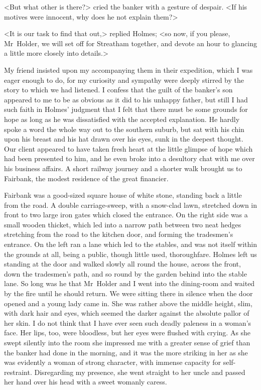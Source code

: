 <But what other is there?> cried the banker with a gesture of despair. <If his motives were innocent, why does he not explain them?>

<It is our task to find that out,> replied Holmes; <so now, if you please, Mr~Holder, we will set off for Streatham together, and devote an hour to glancing a little more closely into details.>

My friend insisted upon my accompanying them in their expedition, which I was eager enough to do, for my curiosity and sympathy were deeply stirred by the story to which we had listened. I confess that the guilt of the banker's son appeared to me to be as obvious as it did to his unhappy father, but still I had such faith in Holmes' judgment that I felt that there must be some grounds for hope as long as he was dissatisfied with the accepted explanation. He hardly spoke a word the whole way out to the southern suburb, but sat with his chin upon his breast and his hat drawn over his eyes, sunk in the deepest thought. Our client appeared to have taken fresh heart at the little glimpse of hope which had been presented to him, and he even broke into a desultory chat with me over his business affairs. A short railway journey and a shorter walk brought us to Fairbank, the modest residence of the great financier.

Fairbank was a good-sized square house of white stone, standing back a little from the road. A double carriage-sweep, with a snow-clad lawn, stretched down in front to two large iron gates which closed the entrance. On the right side was a small wooden thicket, which led into a narrow path between two neat hedges stretching from the road to the kitchen door, and forming the tradesmen's entrance. On the left ran a lane which led to the stables, and was not itself within the grounds at all, being a public, though little used, thoroughfare. Holmes left us standing at the door and walked slowly all round the house, across the front, down the tradesmen's path, and so round by the garden behind into the stable lane. So long was he that Mr~Holder and I went into the dining-room and waited by the fire until he should return. We were sitting there in silence when the door opened and a young lady came in. She was rather above the middle height, slim, with dark hair and eyes, which seemed the darker against the absolute pallor of her skin. I do not think that I have ever seen such deadly paleness in a woman's face. Her lips, too, were bloodless, but her eyes were flushed with crying. As she swept silently into the room she impressed me with a greater sense of grief than the banker had done in the morning, and it was the more striking in her as she was evidently a woman of strong character, with immense capacity for self-restraint. Disregarding my presence, she went straight to her uncle and passed her hand over his head with a sweet womanly caress.

